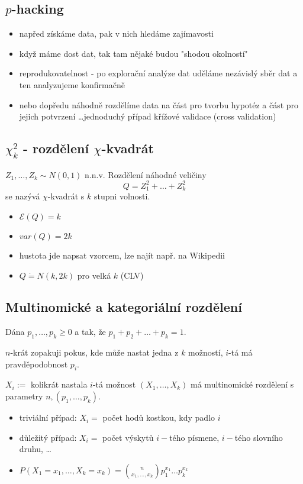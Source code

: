 \documentclass[../main.tex]{subfiles}
\begin{document}
\subsection{$p$-hacking}
\begin{itemize}
    \item napřed získáme data, pak v nich hledáme zajímavosti
    \item když máme dost dat, tak tam nějaké budou "shodou okolností"
    \item reprodukovatelnost - po explorační analýze dat uděláme nezávislý sběr dat a ten analyzujeme konfirmačně
    \item nebo dopředu náhodně rozdělíme data na část pro tvorbu hypotéz a část pro jejich potvrzení \dots jednoduchý případ křížové validace (cross validation)
\end{itemize}

\subsection{$\chi^2_k$ - rozdělení $\chi$-kvadrát}
\begin{definition}
    $Z_1,\dots,Z_k \sim N(0,1)$ n.n.v. Rozdělení náhodné veličiny
    \[Q = Z^2_1 + \dots + Z^2_k\]
    se nazývá $\chi$-kvadrát s $k$ stupni volnosti.
    \begin{itemize}
        \item $\mathcal{E}(Q) = k$
        \item $var(Q) = 2k$
        \item hustota jde napsat vzorcem, lze najít např. na Wikipedii
        \item $Q \dot{=} N(k,2k)$ pro velká $k$ (CLV)
    \end{itemize}
\end{definition}

\subsection{Multinomické a kategoriální rozdělení}
\begin{definition}
    Dána $p_1,\dots,p_k \geq 0$ a tak, že $p_1 + p_2 + \dots + p_k = 1$.
    
    $n$-krát zopakuji pokus, kde může nastat jedna z $k$ možností, $i$-tá má pravděpodobnost $p_i$.

    $X_i :=$ kolikrát nastala $i$-tá možnost $(X_1,\dots,X_k)$ má multinomické rozdělení s parametry $n,(p_1,\dots,p_k).$
    \begin{itemize}
        \item triviální případ: $X_i = $ počet hodů kostkou, kdy padlo $i$
        \item důležitý případ: $X_i = $ počet výskytů $i-$tého písmene, $i-$tého slovního druhu, \dots
        \item $P(X_1 = x_1, \dots , X_k = x_k) = {{n}\choose{x_1,\dots ,x_k}}p_{1}^{x_1}\dots p_{k}^{x_k}$
    \end{itemize}
\end{definition}
\end{document}
